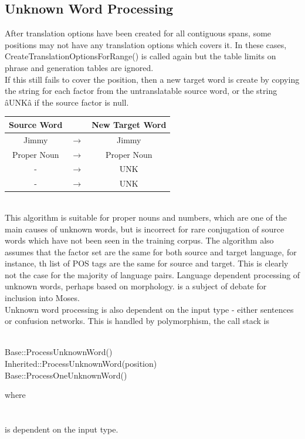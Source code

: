\documentclass[11pt]{book}
\theoremstyle{plain}
\begin{document}
\subsection{Unknown Word Processing}
After translation options have been created for all contiguous spans, some positions may not have any translation options which covers it. In these cases, CreateTranslationOptionsForRange() is called again but the table limits on phrase and generation tables are ignored. \\
If this still fails to cover the position, then a new target word is create by copying the string for each factor from the untranslatable source word, or the string âUNKâ if the source factor is null.\\

\begin{tabular}{|c|c|c|}
\hline
Source Word & & New Target Word \\ \hline
Jimmy	& 	$\to$	& Jimmy\\
Proper Noun	& $\to$	& Proper Noun\\
-	& $\to$	& UNK\\
-	& $\to$	& UNK\\ \hline
\end{tabular}
\\
This algorithm is suitable for proper nouns and numbers, which are one of the main causes of unknown words, but is incorrect for rare conjugation of source words which have not been seen in the training corpus. The algorithm also assumes that the factor set are the same for both source and target language, for instance, th list of POS tags are the same for source and target. This is clearly not the case for the majority of language pairs. Language dependent processing of unknown words, perhaps based on morphology. is a subject of debate for inclusion into Moses.\\
Unknown word processing is also dependent on the input type - either sentences or confusion networks. This is handled by polymorphism, the call stack is\\
\\
\begin{tt}
\indent	Base::ProcessUnknownWord()\\
\indent \indent	Inherited::ProcessUnknownWord(position)\\
\indent \indent \indent	Base::ProcessOneUnknownWord()\\
\end{tt}
where\\
\\
\\
is dependent on the input type.
\end{document}
